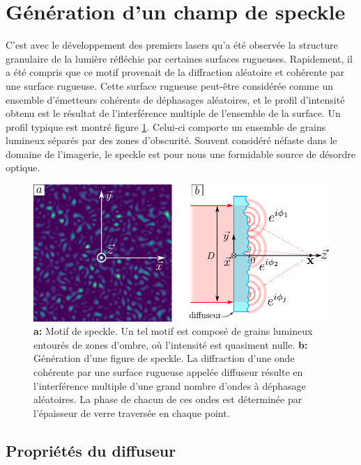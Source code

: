 \section{Génération d'un champ de speckle}
C'est avec le développement des premiers lasers qu'a été observée la structure granulaire de la lumière réfléchie par certaines surfaces rugueuses. Rapidement, il a été compris que ce motif provenait de la diffraction aléatoire et cohérente par une surface rugueuse. 
Cette surface rugueuse peut-être considérée comme un ensemble d'émetteurs cohérents de déphasages aléatoires, et le profil d'intensité obtenu est le résultat de l'interférence multiple de l'ensemble de la surface. Un profil typique est montré figure \ref{fig:speckle_pattern}. Celui-ci comporte un ensemble de grains lumineux séparés par des zones d'obscurité.
Souvent considéré néfaste dans le domaine de l'imagerie, le speckle est pour nous une formidable source de désordre optique. 

\begin{figure}
\centering
\includegraphics[scale=1]{Fig/Speckle/speckle_pattern.pdf}
\caption{\textbf{a:} Motif de speckle. Un tel motif est composé de grains lumineux entourés de zones d'ombre, où l'intensité est quasiment nulle. \textbf{b:} Génération d'une figure de speckle. La diffraction d'une onde cohérente par une surface rugueuse appelée diffuseur résulte en l'interférence multiple d'une grand nombre d'ondes à déphasage aléatoires. La phase de chacun de ces ondes est déterminée par l'épaisseur de verre traversée en chaque point.}
\label{fig:speckle_pattern}
\end{figure}

\subsection{Propriétés du diffuseur}

